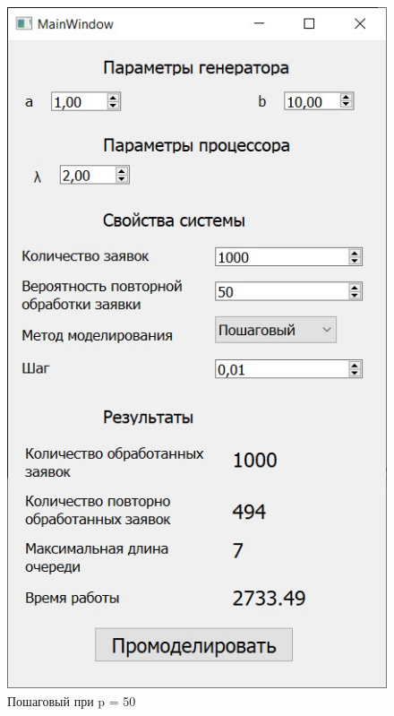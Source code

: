\documentclass[14pt, a4paper]{extarticle}
\begin{document}
\begin{figure}[h!]
	\centering
	\includegraphics[scale=0.6]{source/step50.jpg}
	\caption{Пошаговый при p = 50}
\end{figure}
\end{document}

